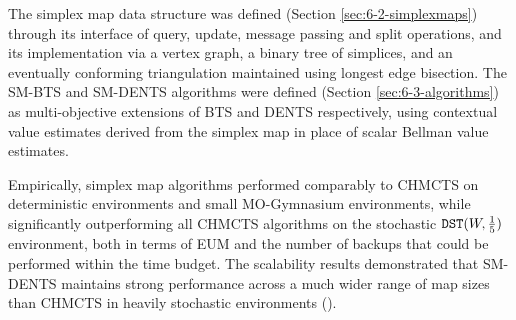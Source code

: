     The simplex map data structure was defined 
    (Section \ref{sec:6-2-simplexmaps}) through its 
    interface of query, update, message passing and 
    split operations, and its implementation via a 
    vertex graph, a binary tree of simplices, and an 
    eventually conforming triangulation maintained using 
    longest edge bisection. The SM-BTS and SM-DENTS 
    algorithms were defined (Section 
    \ref{sec:6-3-algorithms}) as multi-objective 
    extensions of BTS and DENTS respectively, using 
    contextual value estimates derived from the simplex 
    map in place of scalar Bellman value estimates.

    Empirically, simplex map algorithms performed 
    comparably to CHMCTS on deterministic environments 
    and small MO-Gymnasium environments, while 
    significantly outperforming all CHMCTS algorithms 
    on the stochastic ${\textnormal{\texttt{DST}}}(W,\frac{1}{5})$ environment, both in terms of 
    EUM and the number of backups that could be 
    performed within the time budget. The scalability 
    results demonstrated that SM-DENTS maintains strong 
    performance across a much wider range of map sizes 
    than CHMCTS in heavily stochastic environments (\moscalabilityq).